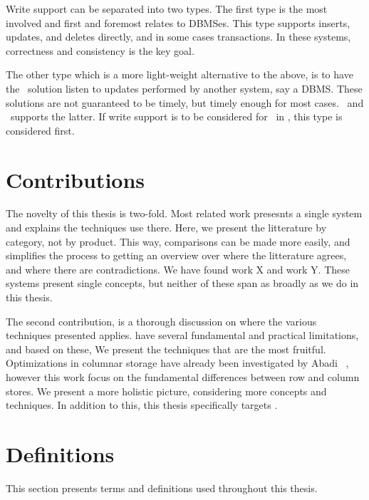 Write support can be separated into two types. The first type is the most involved and first and foremost relates to DBMSes. This type supports inserts, updates, and deletes directly, and in some cases transactions. In these systems, correctness and consistency is the key goal.

The other type which is a more light-weight alternative to the above, is to have the \bd~solution listen to updates performed by another system, say a DBMS. These solutions are not guaranteed to be timely, but timely enough for most cases. \qlikview~and \tableau~supports the latter. If write support is to be considered for \bd~in \genusSoftware, this type is considered first.




\section{Contributions}
\label{sec:Contributions}
The novelty of this thesis is two-fold. Most related work presesnts a single system and explains the techniques use there. Here, we present the litterature by category, not by product. This way, comparisons can be made more easily, and simplifies the process to getting an overview over where the litterature agrees, and where there are contradictions. We have found work X and work Y. These systems present single concepts, but neither of these span as broadly as we do in this thesis.

The second contribution, is a thorough discussion on where the various techniques presented applies. \genusSoftware have several fundamental and practical limitations, and based on these, We present the techniques that are the most fruitful. Optimizations in columnar storage have already been investigated by Abadi \ea~\cite{Abadi2008-dd}, however this work focus on the fundamental differences between row and column stores. We present a more holistic picture, considering more concepts and techniques. In addition to this, this thesis specifically targets \genusSoftware.

\section{Definitions}
\label{sec:Definitions}
This section presents terms and definitions used throughout this thesis.

